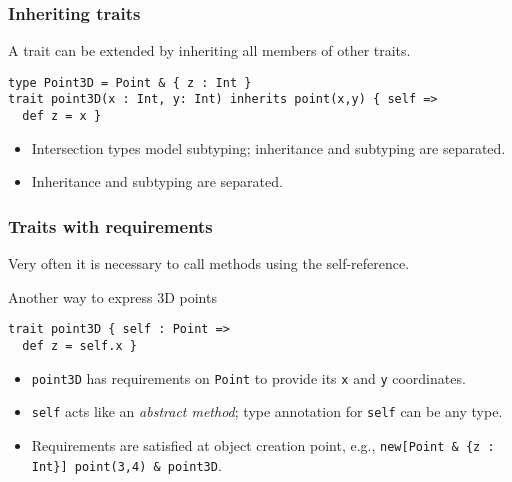 \documentclass{beamer}
\begin{document}
\begin{frame}[fragile]
  \frametitle{Inheriting traits}

  A trait can be extended by inheriting all members of other traits.

  \begin{exampleblock}{}
\begin{lstlisting}
type Point3D = Point & { z : Int }
trait point3D(x : Int, y: Int) inherits point(x,y) { self =>
  def z = x }
\end{lstlisting}

  \end{exampleblock}


    \begin{itemize}
    \item Intersection types model subtyping; inheritance and subtyping are
      separated.
    \item Inheritance and subtyping are separated.
    \end{itemize}

\end{frame}


\begin{frame}[fragile]
  \frametitle{Traits with requirements}

  Very often it is necessary to call methods using the self-reference.


  \begin{exampleblock}{Another way to express 3D points}
\begin{lstlisting}
trait point3D { self : Point =>
  def z = self.x }
\end{lstlisting}

  \end{exampleblock}

  \begin{itemize}
  \item \lstinline{point3D} has requirements on \lstinline{Point} to provide its
    \lstinline$x$ and \lstinline$y$ coordinates.
  \item \lstinline{self} acts like an \textit{abstract method}; type annotation
    for \lstinline{self} can be any type.
  \item Requirements are satisfied at object creation point, e.g., \lstinline$new[Point & {z : Int}] point(3,4) & point3D$.

  \end{itemize}


\end{frame}
\end{document}
